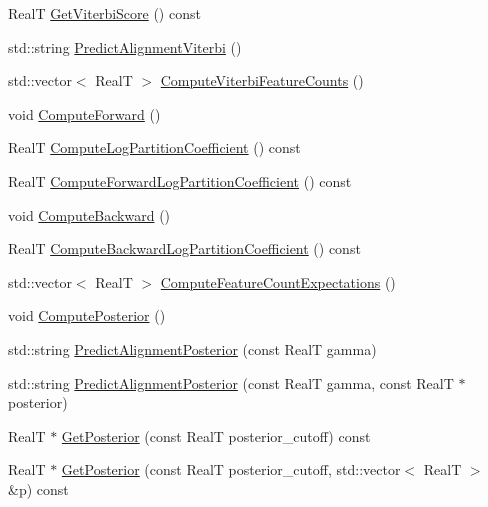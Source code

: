 \begin{DoxyCompactItemize}
\item 
Real\+T \hyperlink{class_c_o_n_t_r_a_l_i_g_n_1_1_inference_engine_a12a4e655e8f06f81a06564f8f81499dc}{Get\+Viterbi\+Score} () const 
\item 
std\+::string \hyperlink{class_c_o_n_t_r_a_l_i_g_n_1_1_inference_engine_acf65a4032f4474763b32dbaf6e3c3d8f}{Predict\+Alignment\+Viterbi} ()
\item 
std\+::vector$<$ Real\+T $>$ \hyperlink{class_c_o_n_t_r_a_l_i_g_n_1_1_inference_engine_af033e32a3d67b565b59aa632dae0152c}{Compute\+Viterbi\+Feature\+Counts} ()
\item 
void \hyperlink{class_c_o_n_t_r_a_l_i_g_n_1_1_inference_engine_a701b7f613c68f76862026669e88b3b5f}{Compute\+Forward} ()
\item 
Real\+T \hyperlink{class_c_o_n_t_r_a_l_i_g_n_1_1_inference_engine_a2e11e84d4854b492fc3ab4eda0c7aa84}{Compute\+Log\+Partition\+Coefficient} () const 
\item 
Real\+T \hyperlink{class_c_o_n_t_r_a_l_i_g_n_1_1_inference_engine_ae3957a178187854f9b7e3812630cee5e}{Compute\+Forward\+Log\+Partition\+Coefficient} () const 
\item 
void \hyperlink{class_c_o_n_t_r_a_l_i_g_n_1_1_inference_engine_a52aa2f5fe909f3873fe4613f3caabb2c}{Compute\+Backward} ()
\item 
Real\+T \hyperlink{class_c_o_n_t_r_a_l_i_g_n_1_1_inference_engine_a366a06d30a6e179448c3a09b9a776550}{Compute\+Backward\+Log\+Partition\+Coefficient} () const 
\item 
std\+::vector$<$ Real\+T $>$ \hyperlink{class_c_o_n_t_r_a_l_i_g_n_1_1_inference_engine_a6d8a78e3c1a7dcffffa26d3ea7ddd92b}{Compute\+Feature\+Count\+Expectations} ()
\item 
void \hyperlink{class_c_o_n_t_r_a_l_i_g_n_1_1_inference_engine_aef03cd26f3758cfff297703bb37b5e9f}{Compute\+Posterior} ()
\item 
std\+::string \hyperlink{class_c_o_n_t_r_a_l_i_g_n_1_1_inference_engine_a72bca0808295ba52e2d5bc861a77192f}{Predict\+Alignment\+Posterior} (const Real\+T gamma)
\item 
std\+::string \hyperlink{class_c_o_n_t_r_a_l_i_g_n_1_1_inference_engine_a13a6fdef8a05d60f4a990e0e8f14788b}{Predict\+Alignment\+Posterior} (const Real\+T gamma, const Real\+T $\ast$posterior)
\item 
Real\+T $\ast$ \hyperlink{class_c_o_n_t_r_a_l_i_g_n_1_1_inference_engine_a7eacc75414f604df8f894e864f8dfae9}{Get\+Posterior} (const Real\+T posterior\+\_\+cutoff) const 
\item 
Real\+T $\ast$ \hyperlink{class_c_o_n_t_r_a_l_i_g_n_1_1_inference_engine_a2d53131fbdb1963dcdc56cfffa3d2be5}{Get\+Posterior} (const Real\+T posterior\+\_\+cutoff, std\+::vector$<$ Real\+T $>$ \&p) const 
\end{DoxyCompactItemize}


